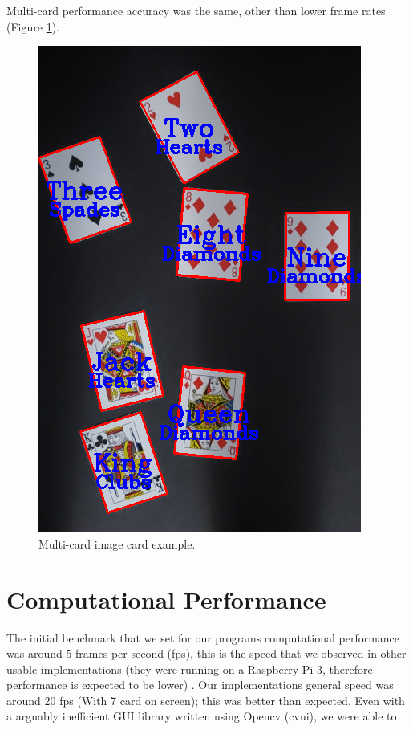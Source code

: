 \documentclass[conference]{IEEEtran}
\begin{document}
 Multi-card performance accuracy was the same, other than lower frame rates (Figure \ref{fig:multi-card-image}).

\begin{figure}[htbp]
\centerline{\includegraphics[width=\columnwidth]{multi-card-image.png}}
\caption{Multi-card image card example.}
\label{fig:multi-card-image}
\end{figure}


\section{Computational Performance}
The initial benchmark that we set for our programs computational performance was around 5 frames per
second (fps), this is the speed that we observed in other usable implementations (they were running
on a Raspberry Pi 3, therefore performance is expected to be lower) \cite{opencv-card-detection}.
Our implementations general speed was around 20 fps (With 7 card on screen); this was better than
expected. Even with a arguably inefficient GUI library written using Opencv (cvui), we were able to 
\end{document}
